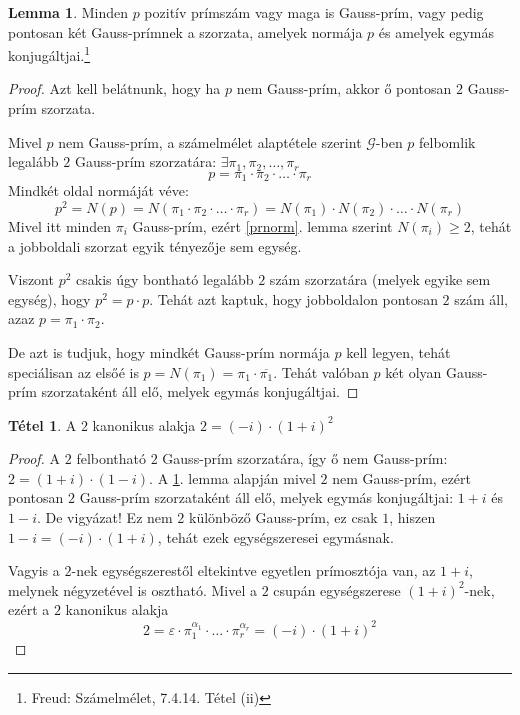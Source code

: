 \documentclass[12pt]{book}
\theoremstyle{plain} %
\theoremstyle{definition} %
\newtheorem{lem/}{Lemma}[section]
\newenvironment{lem}
  {\renewcommand{\qedsymbol}{$\clubsuit$}%
   \pushQED{\qed}\begin{lem/}}
  {\popQED\end{lem/}}
\newtheorem{theo/}{Tétel}[section]
\newenvironment{theo}
  {\renewcommand{\qedsymbol}{$\clubsuit$}%
   \pushQED{\qed}\begin{theo/}}
  {\popQED\end{theo/}}
\theoremstyle{remark}
\renewcommand\qedsymbol{$\blacksquare$}
\numberwithin{equation}{section}  %
\def\G{\mathcal{G}}
\begin{document}
	\begin{lem}\label{gpl2}
		Minden $p$ pozitív prímszám vagy maga is Gauss-prím, vagy pedig pontosan két Gauss-prímnek a szorzata, amelyek normája $p$ és amelyek egymás konjugáltjai.\footnote{Freud: Számelmélet, 7.4.14. Tétel (ii)}
	\end{lem}

	\begin{proof}
		Azt kell belátnunk, hogy ha $p$ nem Gauss-prím, akkor ő pontosan $2$ Gauss-prím szorzata.
		
		Mivel $p$ nem Gauss-prím, a számelmélet alaptétele szerint $\G$-ben $p$ felbomlik legalább $2$ Gauss-prím szorzatára: $\exists \pi_1,\pi_2,\ldots,\pi_r$
		\[ p = \pi_1 \cdot \pi_2 \cdot \ldots \cdot \pi_r  \]
		Mindkét oldal normáját véve:
		\[ p^2=N(p) = N(\pi_1 \cdot \pi_2 \cdot \ldots \cdot \pi_r) = N(\pi_1) \cdot N(\pi_2)\cdot \ldots \cdot N(\pi_r) \]
		Mivel itt minden $\pi_i$ Gauss-prím, ezért \ref{prnorm}. lemma szerint $N(\pi_i)\geq 2$, tehát a jobboldali szorzat egyik tényezője sem egység.
		
		Viszont $p^2$ csakis úgy bontható legalább $2$ szám szorzatára (melyek egyike sem egység), hogy $p^2 = p\cdot p$. Tehát azt kaptuk, hogy jobboldalon pontosan $2$ szám áll, azaz $p=\pi_1\cdot \pi_2$.
		
		De azt is tudjuk, hogy mindkét Gauss-prím normája $p$ kell legyen, tehát speciálisan az elsőé is $p = N(\pi_1) = \pi_1 \cdot \overline{\pi_1} $. Tehát valóban $p$ két olyan Gauss-prím szorzataként áll elő, melyek egymás konjugáltjai.
	\end{proof}

	\begin{theo}
		A $2$ kanonikus alakja $2=(-i)\cdot (1+i)^2$
	\end{theo}

	\begin{proof}
		A $2$ felbontható $2$ Gauss-prím szorzatára, így ő nem Gauss-prím: $2=(1+i)\cdot (1-i)$.
		A \ref{gpl2}. lemma alapján mivel $2$ nem Gauss-prím, ezért pontosan $2$ Gauss-prím szorzataként áll elő, melyek egymás konjugáltjai: $1+i$ és $1-i$. De vigyázat! Ez nem $2$ különböző Gauss-prím, ez csak $1$, hiszen $1-i = (-i) \cdot (1+i)$, tehát ezek egységszeresei egymásnak.
		
		Vagyis a $2$-nek egységszerestől eltekintve egyetlen prímosztója van, az $1+i$, melynek négyzetével is osztható. Mivel a $2$ csupán egységszerese $(1+i)^2$-nek, ezért a $2$ kanonikus alakja 
		\[ 2 = \varepsilon \cdot \pi_1^{\alpha_1} \cdot \ldots \cdot \pi_r^{\alpha_r} =  (-i)\cdot (1+i)^2 \]
	\end{proof}
\end{document}
